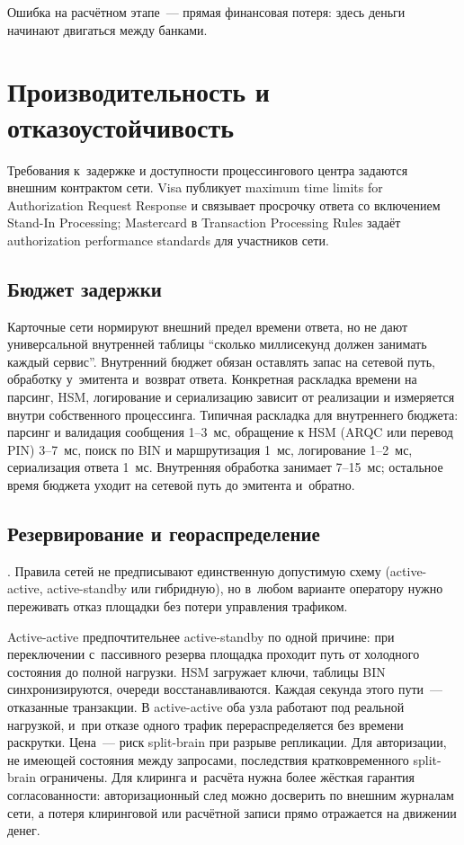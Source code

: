 Ошибка на расчётном этапе~--- прямая финансовая потеря:
здесь деньги начинают двигаться между банками.

\section{Производительность и отказоустойчивость}\label{sec:pc-performance}

Требования к~задержке и доступности процессингового центра
задаются внешним контрактом сети. Visa публикует maximum time limits
for Authorization Request Response и связывает просрочку
ответа со включением Stand-In Processing; Mastercard
в Transaction Processing Rules задаёт authorization
performance standards для участников сети.~\cite{visa-core-rules,mc-tpr}

\subsection*{Бюджет задержки}

Карточные сети нормируют внешний предел времени ответа, но не дают
универсальной внутренней таблицы \enquote{сколько миллисекунд
должен занимать каждый сервис}. Внутренний бюджет обязан
оставлять запас на сетевой путь, обработку у~эмитента
и~возврат ответа. Конкретная раскладка времени на парсинг,
HSM, логирование и сериализацию зависит от реализации
и измеряется внутри собственного процессинга. Типичная раскладка
для внутреннего бюджета: парсинг и валидация сообщения
1--3~мс, обращение к HSM (ARQC или перевод PIN) 3--7~мс,
поиск по BIN и маршрутизация 1~мс, логирование 1--2~мс,
сериализация ответа 1~мс. Внутренняя обработка занимает 7--15~мс;
остальное время бюджета уходит на сетевой путь до эмитента и~обратно.

\subsection*{Резервирование и геораспределение}

. Правила сетей не
предписывают единственную допустимую схему (active-active,
active-standby или гибридную), но в~любом варианте оператору
нужно переживать отказ площадки без потери управления трафиком.

Active-active предпочтительнее active-standby по одной причине:
при переключении с~пассивного резерва площадка проходит путь
от холодного состояния до полной нагрузки. HSM загружает ключи,
таблицы BIN синхронизируются, очереди восстанавливаются. Каждая
секунда этого пути~--- отказанные транзакции. В active-active оба
узла работают под реальной нагрузкой, и~при отказе одного
трафик перераспределяется без времени раскрутки. Цена~--- риск
split-brain при разрыве репликации. Для авторизации, не
имеющей состояния между запросами, последствия кратковременного
split-brain ограничены. Для клиринга и~расчёта нужна более жёсткая
гарантия согласованности: авторизационный след можно досверить
по внешним журналам сети, а потеря клиринговой или расчётной
записи прямо отражается на движении денег.

